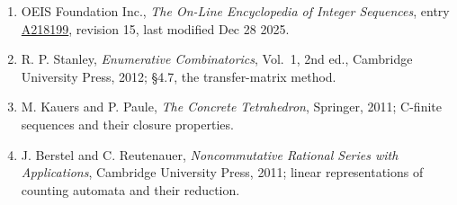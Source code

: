 \documentclass[11pt]{article}
\theoremstyle{definition}
\begin{document}
\begin{enumerate}

\item OEIS Foundation Inc., \emph{The On-Line Encyclopedia of Integer Sequences}, entry \href{https://oeis.org/A218199}{A218199}, revision 15, last modified Dec 28 2025.

\item R. P. Stanley, \emph{Enumerative Combinatorics}, Vol.~1, 2nd ed., Cambridge University Press, 2012; \S4.7, the transfer-matrix method.

\item M. Kauers and P. Paule, \emph{The Concrete Tetrahedron}, Springer, 2011; C-finite sequences and their closure properties.

\item J. Berstel and C. Reutenauer, \emph{Noncommutative Rational Series with Applications}, Cambridge University Press, 2011; linear representations of counting automata and their reduction.

\end{enumerate}
\end{document}
